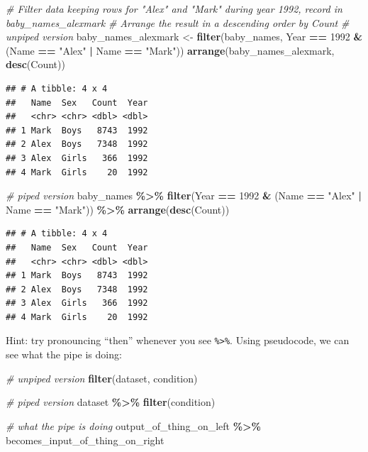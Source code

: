 \documentclass[
]{book}
\newenvironment{Shaded}{\begin{snugshade}}{\end{snugshade}}
\newcommand{\CommentTok}[1]{\textcolor[rgb]{0.56,0.35,0.01}{\textit{#1}}}
\newcommand{\DecValTok}[1]{\textcolor[rgb]{0.00,0.00,0.81}{#1}}
\newcommand{\KeywordTok}[1]{\textcolor[rgb]{0.13,0.29,0.53}{\textbf{#1}}}
\newcommand{\NormalTok}[1]{#1}
\newcommand{\OperatorTok}[1]{\textcolor[rgb]{0.81,0.36,0.00}{\textbf{#1}}}
\newcommand{\StringTok}[1]{\textcolor[rgb]{0.31,0.60,0.02}{#1}}
\begin{document}
\begin{Shaded}
\begin{Highlighting}[]
\CommentTok{\# Filter data keeping rows for "Alex" and "Mark" during year 1992, record in baby\_names\_alexmark}
\CommentTok{\# Arrange the result in a descending order by Count}
\CommentTok{\# unpiped version}
\NormalTok{baby\_names\_alexmark \textless{}{-}}\StringTok{ }\KeywordTok{filter}\NormalTok{(baby\_names, Year }\OperatorTok{==}\StringTok{ }\DecValTok{1992} \OperatorTok{\&}\StringTok{ }\NormalTok{(Name }\OperatorTok{==}\StringTok{ "Alex"} \OperatorTok{|}\StringTok{ }\NormalTok{Name }\OperatorTok{==}\StringTok{ "Mark"}\NormalTok{))}
\KeywordTok{arrange}\NormalTok{(baby\_names\_alexmark, }\KeywordTok{desc}\NormalTok{(Count))}
\end{Highlighting}
\end{Shaded}

\begin{verbatim}
## # A tibble: 4 x 4
##   Name  Sex   Count  Year
##   <chr> <chr> <dbl> <dbl>
## 1 Mark  Boys   8743  1992
## 2 Alex  Boys   7348  1992
## 3 Alex  Girls   366  1992
## 4 Mark  Girls    20  1992
\end{verbatim}

\begin{Shaded}
\begin{Highlighting}[]
\CommentTok{\# piped version}
\NormalTok{baby\_names }\OperatorTok{\%\textgreater{}\%}\StringTok{ }
\StringTok{  }\KeywordTok{filter}\NormalTok{(Year }\OperatorTok{==}\StringTok{ }\DecValTok{1992} \OperatorTok{\&}\StringTok{ }\NormalTok{(Name }\OperatorTok{==}\StringTok{ "Alex"} \OperatorTok{|}\StringTok{ }\NormalTok{Name }\OperatorTok{==}\StringTok{ "Mark"}\NormalTok{)) }\OperatorTok{\%\textgreater{}\%}
\StringTok{  }\KeywordTok{arrange}\NormalTok{(}\KeywordTok{desc}\NormalTok{(Count))}
\end{Highlighting}
\end{Shaded}

\begin{verbatim}
## # A tibble: 4 x 4
##   Name  Sex   Count  Year
##   <chr> <chr> <dbl> <dbl>
## 1 Mark  Boys   8743  1992
## 2 Alex  Boys   7348  1992
## 3 Alex  Girls   366  1992
## 4 Mark  Girls    20  1992
\end{verbatim}

Hint: try pronouncing ``then'' whenever you see \texttt{\%\textgreater{}\%}. Using pseudocode,
we can see what the pipe is doing:

\begin{Shaded}
\begin{Highlighting}[]
\CommentTok{\# unpiped version}
\KeywordTok{filter}\NormalTok{(dataset, condition)}

\CommentTok{\# piped version}
\NormalTok{dataset }\OperatorTok{\%\textgreater{}\%}\StringTok{ }\KeywordTok{filter}\NormalTok{(condition)}

\CommentTok{\# what the pipe is doing}
\NormalTok{output\_of\_thing\_on\_left }\OperatorTok{\%\textgreater{}\%}\StringTok{ }\NormalTok{becomes\_input\_of\_thing\_on\_right}
\end{Highlighting}
\end{Shaded}
\end{document}
